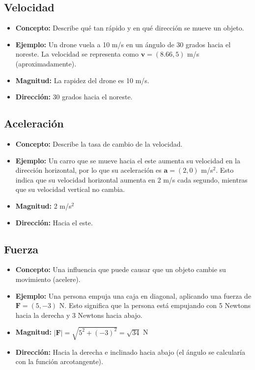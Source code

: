 \documentclass[11pt,a4paper]{book}
\begin{document}
\subsection{Velocidad}
\begin{itemize}
    \item \textbf{Concepto:} Describe qué tan rápido y en qué dirección se mueve un objeto.
    \item \textbf{Ejemplo:} Un drone vuela a 10 m/s en un ángulo de 30 grados hacia el noreste. La velocidad se representa como $\textbf{v} = (8.66, 5)$ m/s (aproximadamente).
    \item \textbf{Magnitud:} La rapidez del drone es 10 m/s.
    \item \textbf{Dirección:} 30 grados hacia el noreste.
\end{itemize}

\subsection{Aceleración}
\begin{itemize}
    \item \textbf{Concepto:} Describe la tasa de cambio de la velocidad.
    \item \textbf{Ejemplo:} Un carro que se mueve hacia el este aumenta su velocidad en la dirección horizontal, por lo que su aceleración es $\textbf{a} = (2, 0)$ m/s$^2$.  Esto indica que su velocidad horizontal aumenta en 2 m/s cada segundo, mientras que su velocidad vertical no cambia.
    \item \textbf{Magnitud:} 2 m/s$^2$
    \item \textbf{Dirección:} Hacia el este.
\end{itemize}

\subsection{Fuerza}
\begin{itemize}
    \item \textbf{Concepto:} Una influencia que puede causar que un objeto cambie su movimiento (acelere).
    \item \textbf{Ejemplo:} Una persona empuja una caja en diagonal, aplicando una fuerza de $\textbf{F} = (5, -3)$ N.  Esto significa que la persona está empujando con 5 Newtons hacia la derecha y 3 Newtons hacia abajo.
    \item \textbf{Magnitud:} $|\textbf{F}|=\sqrt{5^2+(-3)^2} = \sqrt{34}$ N
    \item \textbf{Dirección:} Hacia la derecha e inclinado hacia abajo (el ángulo se calcularía con la función arcotangente).
\end{itemize}
\end{document}
